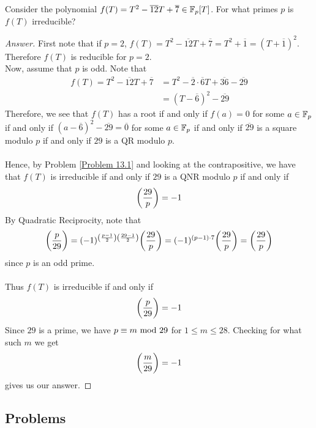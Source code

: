 \begin{example}
Consider the polynomial $f(T) = T^2 - \overline{12}T + \overline{7} \in \mathbb F_p[T]$. For what primes $p$ is $f(T)$ irreducible?
\end{example}
\begin{proof}[Answer]
First note that if $p = 2$, $f(T) = T^2 - \overline{12}T + \overline{7} = T^2 + \overline{1} = (T + \overline{1})^2$. Therefore $f(T)$ is reducible for $p = 2$.\\
Now, assume that $p$ is odd. Note that 
\begin{align*}
f(T) = T^2 - \overline{12}T + \overline{7} &= T^2 - \overline{2}\cdot\overline{6} T + \overline{36} - \overline{29}\\[0.5em]
&= (T - \overline{6})^2 - \overline{29}
\end{align*}
Therefore, we see that $f(T)$ has a root if and only if $f(a) = 0$ for some $a \in \mathbb F_p$ if and only if $(a - \overline{6})^2 - \overline{29} = \overline{0}$ for some $a \in \mathbb F_p$ if and only if $\overline{29}$ is a square modulo $p$ if and only if $29$ is a QR modulo $p$.\\
\\
Hence, by Problem \ref{Problem 13.1} and looking at the contrapositive, we have that $f(T)$ is irreducible if and only if $29$ is a QNR modulo $p$ if and only if 
\[\bigg(\dfrac{29}{p}\bigg) = -1\]
By Quadratic Reciprocity, note that
\[\bigg(\dfrac{p}{29}\bigg) = (-1)^{\left(\frac{p-1}{2}\right)\left(\frac{29-1}{2}\right)}\bigg(\dfrac{29}{p}\bigg) = (-1)^{(p-1)\cdot 7}\bigg(\dfrac{29}{p}\bigg) = \bigg(\dfrac{29}{p}\bigg)\]
since $p$ is an odd prime.\\
\\
Thus $f(T)$ is irreducible if and only if 
\[\bigg(\dfrac{p}{29}\bigg) = -1\]
Since $29$ is a prime, we have $p \equiv m \text{ mod }{29}$ for $1 \leq m \leq 28$. Checking for what such $m$ we get
\[\bigg(\dfrac{m}{29}\bigg) = -1\]
gives us our answer. 
\end{proof}

\vspace*{0.5in}

\subsection{Problems}
\vspace{0.1in}

